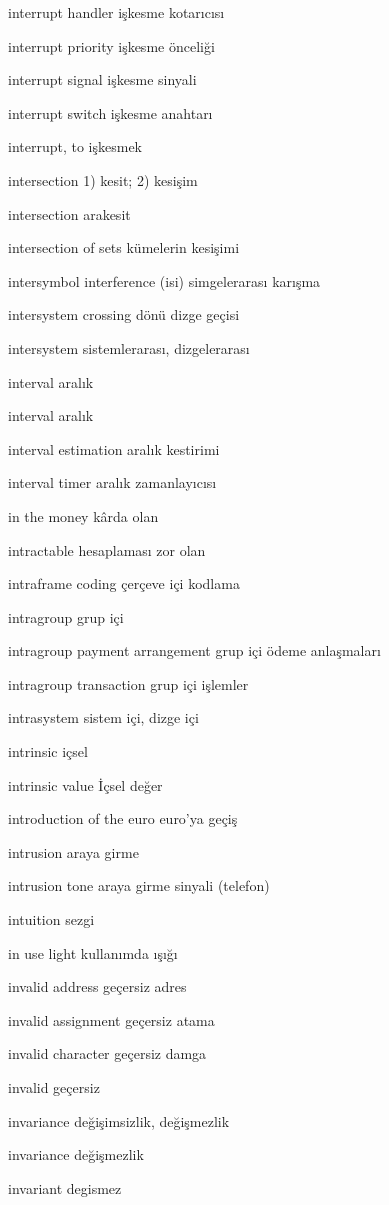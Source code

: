 \documentclass[12pt,fleqn]{article}\usepackage{../../common}
\begin{document}
interrupt handler işkesme kotarıcısı

interrupt priority işkesme önceliği

interrupt signal işkesme sinyali

interrupt switch işkesme anahtarı

interrupt, to işkesmek

intersection 1) kesit; 2) kesişim

intersection arakesit

intersection of sets kümelerin kesişimi

intersymbol interference (isi) simgelerarası karışma

intersystem crossing dönü dizge geçisi

intersystem sistemlerarası, dizgelerarası

interval aralık

interval aralık

interval estimation aralık kestirimi

interval timer aralık zamanlayıcısı

in the money kârda olan

intractable hesaplaması zor olan

intraframe coding çerçeve içi kodlama

intragroup grup içi

intragroup payment arrangement grup içi ödeme anlaşmaları

intragroup transaction grup içi işlemler

intrasystem sistem içi, dizge içi

intrinsic içsel 

intrinsic value İçsel değer

introduction of the euro euro'ya geçiş

intrusion araya girme

intrusion tone araya girme sinyali (telefon)

intuition sezgi

in use light kullanımda ışığı

invalid address geçersiz adres

invalid assignment geçersiz atama

invalid character geçersiz damga

invalid geçersiz

invariance değişimsizlik, değişmezlik

invariance değişmezlik

invariant degismez
\end{document}
